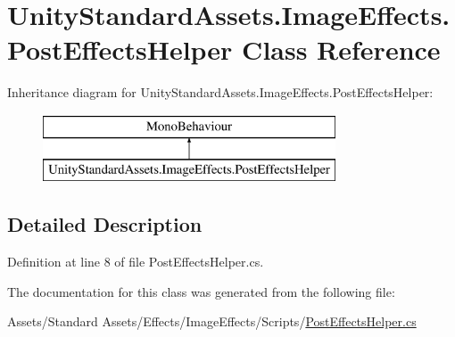 \hypertarget{class_unity_standard_assets_1_1_image_effects_1_1_post_effects_helper}{}\section{Unity\+Standard\+Assets.\+Image\+Effects.\+Post\+Effects\+Helper Class Reference}
\label{class_unity_standard_assets_1_1_image_effects_1_1_post_effects_helper}
Inheritance diagram for Unity\+Standard\+Assets.\+Image\+Effects.\+Post\+Effects\+Helper\+:\begin{figure}[H]
\begin{center}
\leavevmode
\includegraphics[height=2.000000cm]{class_unity_standard_assets_1_1_image_effects_1_1_post_effects_helper}
\end{center}
\end{figure}


\subsection{Detailed Description}


Definition at line 8 of file Post\+Effects\+Helper.\+cs.



The documentation for this class was generated from the following file\+:\begin{DoxyCompactItemize}
\item 
Assets/\+Standard Assets/\+Effects/\+Image\+Effects/\+Scripts/\mbox{\hyperlink{_post_effects_helper_8cs}{Post\+Effects\+Helper.\+cs}}\end{DoxyCompactItemize}
